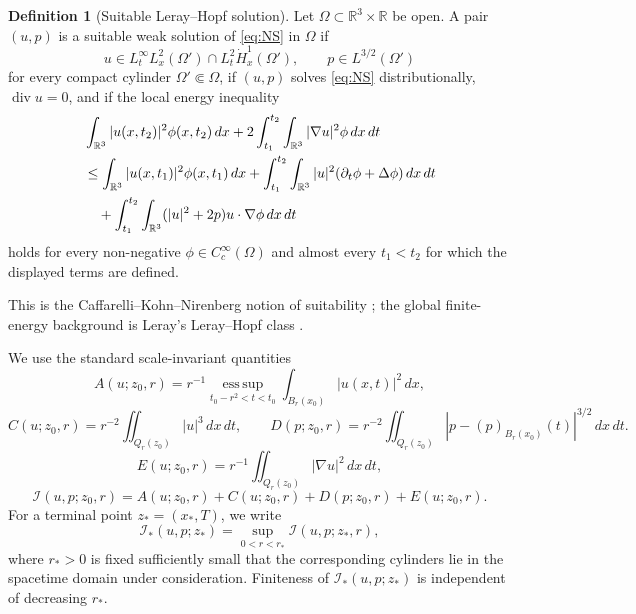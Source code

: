 \documentclass[11pt]{amsart}
\theoremstyle{plain}
\theoremstyle{definition}
\newtheorem{definition}[theorem]{Definition}
\theoremstyle{remark}
\numberwithin{equation}{section}
\newcommand{\R}{\mathbb R}
\newcommand{\divergence}{\operatorname{div}}
\newcommand{\esssup}{\operatorname*{ess\,sup}}
\newcommand{\calI}{\mathcal I}
\begin{document}
\begin{definition}[Suitable Leray--Hopf solution]\label{def:suitable}
Let \(\Omega\subset \R^3\times\R\) be open.  A pair \((u,p)\) is a suitable
weak solution of \eqref{eq:NS} in \(\Omega\) if
\[
   u\in L^\infty_tL^2_x(\Omega')\cap L^2_t\dot H^1_x(\Omega'),
   \qquad
   p\in L^{3/2}(\Omega')
\]
for every compact cylinder \(\Omega'\Subset\Omega\), if \((u,p)\) solves
\eqref{eq:NS} distributionally, \(\divergence u=0\), and if the local energy
inequality
\begin{align}\label{eq:lei}
   &\int_{\R^3}|u(x,t_2)|^2\phi(x,t_2)\,dx
   +2\int_{t_1}^{t_2}\int_{\R^3}|\nabla u|^2\phi\,dx\,dt  \notag\\
   &\le
   \int_{\R^3}|u(x,t_1)|^2\phi(x,t_1)\,dx
   +\int_{t_1}^{t_2}\int_{\R^3}|u|^2(\partial_t\phi+\Delta\phi)\,dx\,dt
   \notag\\
   &\quad
   +\int_{t_1}^{t_2}\int_{\R^3}(|u|^2+2p)u\cdot\nabla\phi\,dx\,dt
\end{align}
holds for every non-negative \(\phi\in C_c^\infty(\Omega)\) and almost every
\(t_1<t_2\) for which the displayed terms are defined.
\end{definition}

This is the Caffarelli--Kohn--Nirenberg notion of suitability
\cite{CKN1982}; the global finite-energy background is Leray's
Leray--Hopf class \cite{Leray1934}.

We use the standard scale-invariant quantities
\begin{equation}\label{eq:C-D-def}
   A(u;z_0,r)=r^{-1}\esssup_{t_0-r^2<t<t_0}
   \int_{B_r(x_0)}|u(x,t)|^2\,dx,
\end{equation}
\begin{equation}\label{eq:C-D-def-2}
   C(u;z_0,r)=r^{-2}\iint_{Q_r(z_0)}|u|^3\,dx\,dt,
   \qquad
   D(p;z_0,r)=r^{-2}\iint_{Q_r(z_0)}
   |p-(p)_{B_r(x_0)}(t)|^{3/2}\,dx\,dt.
\end{equation}
\begin{equation}\label{eq:E-I-def}
   E(u;z_0,r)=r^{-1}\iint_{Q_r(z_0)}|\nabla u|^2\,dx\,dt,
\end{equation}
\begin{equation}\label{eq:I-def}
   \calI(u,p;z_0,r)=
   A(u;z_0,r)+C(u;z_0,r)+D(p;z_0,r)+E(u;z_0,r).
\end{equation}
For a terminal point \(z_*=(x_*,T)\), we write
\begin{equation}\label{eq:centered-I-def}
   \calI_*(u,p;z_*)=
   \sup_{0<r<r_*}\calI(u,p;z_*,r),
\end{equation}
where \(r_*>0\) is fixed sufficiently small that the corresponding cylinders
lie in the spacetime domain under consideration.  Finiteness of
\(\calI_*(u,p;z_*)\) is independent of decreasing \(r_*\).
\end{document}
